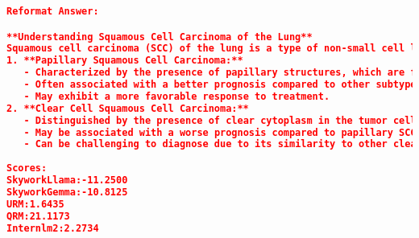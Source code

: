 \begin{lstlisting}[language=json,numbers=none]
Reformat Answer:

**Understanding Squamous Cell Carcinoma of the Lung**
Squamous cell carcinoma (SCC) of the lung is a type of non-small cell lung cancer (NSCLC), accounting for approximately 25-30% of all lung cancer cases. According to the World Health Organization (WHO) histological classification system, SCC of the lung can be classified into four main subtypes:
1. **Papillary Squamous Cell Carcinoma:**
   - Characterized by the presence of papillary structures, which are finger-like projections of tumor cells.
   - Often associated with a better prognosis compared to other subtypes.
   - May exhibit a more favorable response to treatment.
2. **Clear Cell Squamous Cell Carcinoma:**
   - Distinguished by the presence of clear cytoplasm in the tumor cells.
   - May be associated with a worse prognosis compared to papillary SCC.
   - Can be challenging to diagnose due to its similarity to other clear cell tumors.
   
Scores:
SkyworkLlama:-11.2500
SkyworkGemma:-10.8125
URM:1.6435
QRM:21.1173
Internlm2:2.2734
\end{lstlisting}